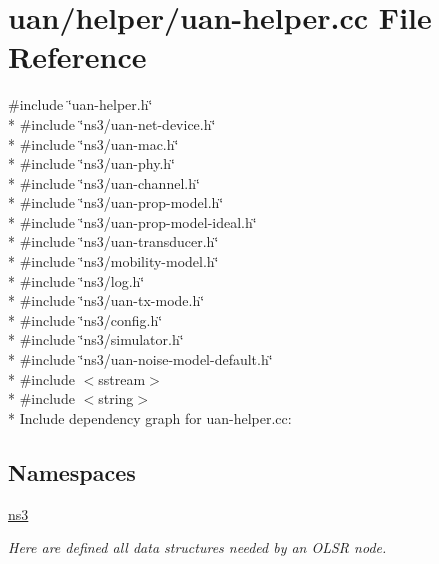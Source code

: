 \hypertarget{uan-helper_8cc}{}\section{uan/helper/uan-\/helper.cc File Reference}
\label{uan-helper_8cc}
{\ttfamily \#include \char`\"{}uan-\/helper.\+h\char`\"{}}\\*
{\ttfamily \#include \char`\"{}ns3/uan-\/net-\/device.\+h\char`\"{}}\\*
{\ttfamily \#include \char`\"{}ns3/uan-\/mac.\+h\char`\"{}}\\*
{\ttfamily \#include \char`\"{}ns3/uan-\/phy.\+h\char`\"{}}\\*
{\ttfamily \#include \char`\"{}ns3/uan-\/channel.\+h\char`\"{}}\\*
{\ttfamily \#include \char`\"{}ns3/uan-\/prop-\/model.\+h\char`\"{}}\\*
{\ttfamily \#include \char`\"{}ns3/uan-\/prop-\/model-\/ideal.\+h\char`\"{}}\\*
{\ttfamily \#include \char`\"{}ns3/uan-\/transducer.\+h\char`\"{}}\\*
{\ttfamily \#include \char`\"{}ns3/mobility-\/model.\+h\char`\"{}}\\*
{\ttfamily \#include \char`\"{}ns3/log.\+h\char`\"{}}\\*
{\ttfamily \#include \char`\"{}ns3/uan-\/tx-\/mode.\+h\char`\"{}}\\*
{\ttfamily \#include \char`\"{}ns3/config.\+h\char`\"{}}\\*
{\ttfamily \#include \char`\"{}ns3/simulator.\+h\char`\"{}}\\*
{\ttfamily \#include \char`\"{}ns3/uan-\/noise-\/model-\/default.\+h\char`\"{}}\\*
{\ttfamily \#include $<$sstream$>$}\\*
{\ttfamily \#include $<$string$>$}\\*
Include dependency graph for uan-\/helper.cc\+:
\subsection*{Namespaces}
\begin{DoxyCompactItemize}
\item 
 \hyperlink{namespacens3}{ns3}
\begin{DoxyCompactList}\small\item\em Here are defined all data structures needed by an O\+L\+SR node. \end{DoxyCompactList}\end{DoxyCompactItemize}
